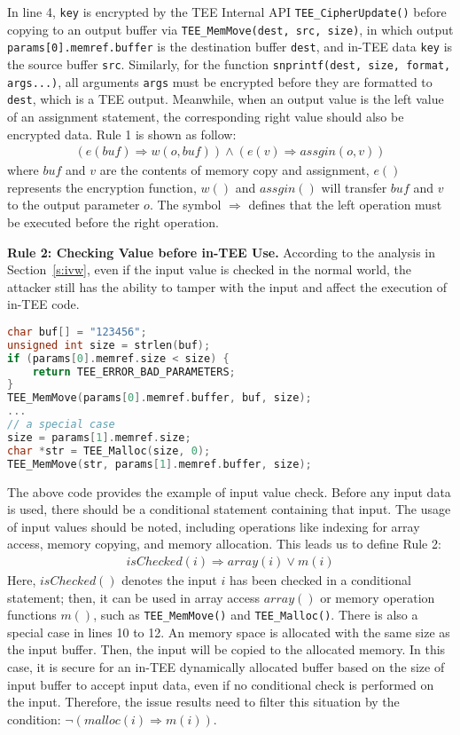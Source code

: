 In line 4, \texttt{key} is encrypted by the TEE Internal API \texttt{TEE\_CipherUpdate()} before copying to an output buffer via \texttt{TEE\_MemMove(dest, src, size)}, in which output \texttt{params[0].memref.buffer} is the destination buffer \texttt{dest}, and in-TEE data \texttt{key} is the source buffer \texttt{src}.
Similarly, for the function \texttt{snprintf(dest, size, format, args...)}, all arguments \texttt{args} must be encrypted before they are formatted to \texttt{dest}, which is a TEE output.
Meanwhile, when an output value is the left value of an assignment statement, the corresponding right value should also be encrypted data. Rule 1 is shown as follow:
\begin{equation}
\begin{aligned}
(e(buf) \Rightarrow w(o,buf))
\land (e(v) \Rightarrow assgin(o,v))
\end{aligned}
\end{equation}
where $buf$ and $v$ are the contents of memory copy and assignment, $e()$ represents the encryption function, $w()$ and $assgin()$ will transfer $buf$ and $v$ to the output parameter $o$.
The symbol $\Rightarrow$ defines that the left operation must be executed before the right operation.

\textbf{Rule 2: Checking Value before in-TEE Use.} According to the analysis in Section~\ref{s:ivw}, even if the input value is checked in the normal world, the attacker still has the ability to tamper with the input and affect the execution of in-TEE code. 
\begin{lstlisting}[language=c++, aboveskip=10pt, belowskip=5pt]
char buf[] = "123456";
unsigned int size = strlen(buf);
if (params[0].memref.size < size) {
    return TEE_ERROR_BAD_PARAMETERS;
}
TEE_MemMove(params[0].memref.buffer, buf, size);
...
// a special case
size = params[1].memref.size;
char *str = TEE_Malloc(size, 0);
TEE_MemMove(str, params[1].memref.buffer, size);
\end{lstlisting}

The above code provides the example of input value check. Before any input data is used, there should be a conditional statement containing that input. The usage of input values should be noted, including operations like indexing for array access, memory copying, and memory allocation. This leads us to define Rule 2:
\begin{equation}
\begin{aligned}
isChecked(i) \Rightarrow array(i) \vee m(i)
\end{aligned}
\end{equation}
Here, $isChecked()$ denotes the input $i$ has been checked in a conditional statement; then, it can be used in array access $array()$ or memory operation functions $m()$, such as \texttt{TEE\_MemMove()} and \texttt{TEE\_Malloc()}.
There is also a special case in lines 10 to 12. An memory space is allocated with the same size as the input buffer. Then, the input will be copied to the allocated memory. In this case, it is secure for an in-TEE dynamically allocated buffer based on the size of input buffer to accept input data, even if no conditional check is performed on the input. Therefore, the issue results need to filter this situation by the condition: $\neg(malloc(i) \Rightarrow m(i))$.

